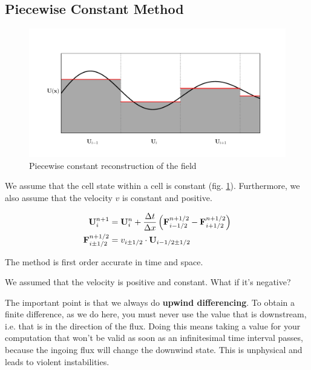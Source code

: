 \subsection{Piecewise Constant Method}\label{chap:advection-pwconst}

\begin{figure}[htbp]
	\includegraphics[width=\textwidth]{./figures/piecewise_const.pdf}%
	\caption{Piecewise constant reconstruction of the field
		\label{fig:pwconst}
	}
\end{figure}


We assume that the cell state within a cell is constant (fig. \ref{fig:pwconst}).
Furthermore, we also assume that the velocity $v$ is constant and positive.


\begin{align}
	\mathbf{U}_i ^{n+1} &= 
		\mathbf{U}_i^{n} +  \frac{\Delta t}{\Delta x} \left( \mathbf{F}_{i-1/2}^{n+1/2} - \mathbf{F}_{i+1/2}^{n+1/2} \right) \label{eq:advection_basic}\\ 
	\mathbf{F}_{i\pm1/2}^{n+1/2} &= v_{i\pm1/2}\cdot \mathbf{U}_{i - 1/2 \pm 1/2} \label{eq:advection_flux}
\end{align}

The method is first order accurate in time and space.





We assumed that the velocity is positive and constant.
What if it's negative?

The important point is that we always do \textbf{upwind differencing}.
To obtain a finite difference, as we do here, you must never use the value that is downstream, i.e. that is in the direction of the flux.
Doing this means taking a value for your computation that won't be valid as soon as an infinitesimal time interval passes, because the ingoing flux will change the downwind state.
This is unphysical and leads to violent instabilities.

